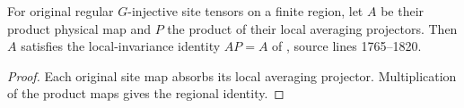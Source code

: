 
\begin{lemma}
    \label{thm:peps_original_region_projector_absorption}
    \leanok
    For original regular $G$-injective site tensors on a finite region, let
    $A$ be their product physical map and $P$ the product of their local
    averaging projectors. Then $A$ satisfies the local-invariance identity $AP=A$ of
    \cite{Schuch2010PEPS}, source lines 1765--1820.
\end{lemma}
\begin{proof}\leanok
    Each original site map absorbs its local averaging projector.
    Multiplication of the product maps gives the regional identity.
\end{proof}


